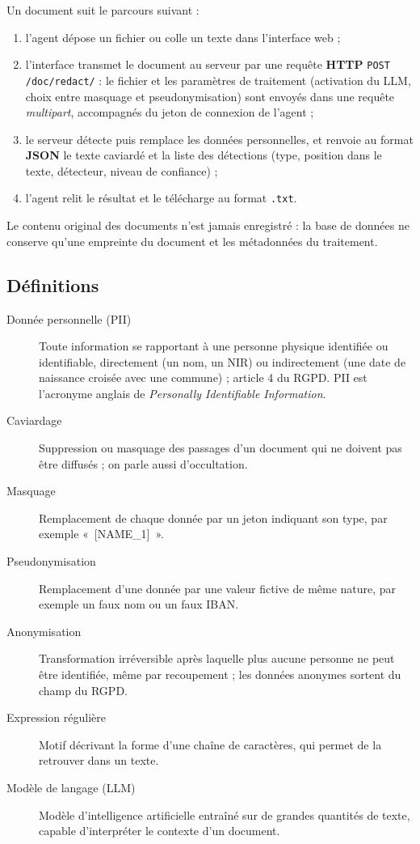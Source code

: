 \documentclass[12pt,a4paper]{article}
\begin{document}
Un document suit le parcours suivant :

\begin{enumerate}
    \item l'agent dépose un fichier ou colle un texte dans l'interface web ;
    \item l'interface transmet le document au serveur par une requête \textbf{HTTP} \texttt{POST /doc/redact/} : le fichier et les paramètres de traitement (activation du LLM, choix entre masquage et pseudonymisation) sont envoyés dans une requête \textit{multipart}, accompagnés du jeton de connexion de l'agent ;
    \item le serveur détecte puis remplace les données personnelles, et renvoie au format \textbf{JSON} le texte caviardé et la liste des détections (type, position dans le texte, détecteur, niveau de confiance) ;
    \item l'agent relit le résultat et le télécharge au format \texttt{.txt}.
\end{enumerate}

Le contenu original des documents n'est jamais enregistré : la base de données ne conserve qu'une empreinte du document et les métadonnées du traitement.

\subsection*{Définitions}

\begin{description}
    \item[Donnée personnelle (PII)] Toute information se rapportant à une personne physique identifiée ou identifiable, directement (un nom, un NIR) ou indirectement (une date de naissance croisée avec une commune) ; article 4 du RGPD. PII est l'acronyme anglais de \textit{Personally Identifiable Information}.
    \item[Caviardage] Suppression ou masquage des passages d'un document qui ne doivent pas être diffusés ; on parle aussi d'occultation.
    \item[Masquage] Remplacement de chaque donnée par un jeton indiquant son type, par exemple «~[NAME\_1]~».
    \item[Pseudonymisation] Remplacement d'une donnée par une valeur fictive de même nature, par exemple un faux nom ou un faux IBAN.
    \item[Anonymisation] Transformation irréversible après laquelle plus aucune personne ne peut être identifiée, même par recoupement ; les données anonymes sortent du champ du RGPD.
    \item[Expression régulière] Motif décrivant la forme d'une chaîne de caractères, qui permet de la retrouver dans un texte.
    \item[Modèle de langage (LLM)] Modèle d'intelligence artificielle entraîné sur de grandes quantités de texte, capable d'interpréter le contexte d'un document.
\end{description}
\end{document}
